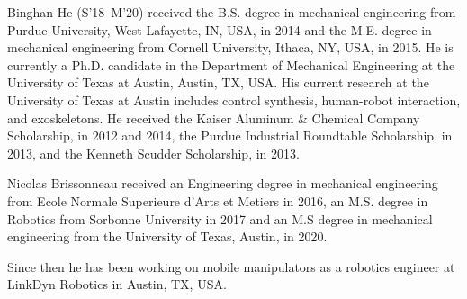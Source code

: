 \documentclass{ieeeaccess}
\begin{document}
\begin{IEEEbiography}
	{Binghan He} (S'18--M'20) received the B.S. degree in mechanical engineering from Purdue University, West Lafayette, IN, USA, in 2014 and the M.E. degree in mechanical engineering from Cornell University, Ithaca, NY, USA, in 2015. He is currently a Ph.D. candidate in the Department of Mechanical Engineering at the University of Texas at Austin, Austin, TX, USA. His current research at the University of Texas at Austin includes control synthesis, human-robot interaction, and exoskeletons. He received the Kaiser Aluminum \& Chemical Company Scholarship, in 2012 and 2014, the Purdue Industrial Roundtable Scholarship, in 2013, and the Kenneth Scudder Scholarship, in 2013.
\end{IEEEbiography}

\begin{IEEEbiography}
	{Nicolas Brissonneau} received an Engineering degree in mechanical engineering from Ecole Normale Superieure d'Arts et Metiers in 2016, an M.S. degree in Robotics from Sorbonne University in 2017 and an M.S degree in mechanical engineering from the University of Texas, Austin, in 2020.
	
	Since then he has been working on mobile manipulators as a robotics engineer at LinkDyn Robotics in Austin, TX, USA.
\end{IEEEbiography}
\end{document}
